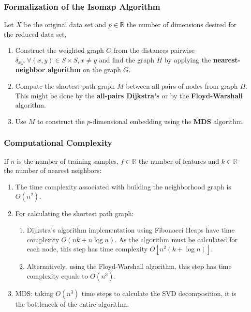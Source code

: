 \documentclass[12pt]{article}
\begin{document}
\subsubsection{Formalization of the Isomap Algorithm}

Let $X$ be the original data set and $p \in \mathbb{R}$ the number of dimensions desired for the reduced data set, \cite{ten2000}

\begin{enumerate}
	\item Construct the weighted graph $G$ from the distances pairwise $\delta_{xy}, \forall (x, y) \in S \times S, x \ne y$ and find the graph $H$ by applying the \textbf{nearest-neighbor algorithm} on the graph $G$.

	\item Compute the shortest path graph $M$ between all pairs of nodes from graph $H$. This might be done by the \textbf{all-pairs Dijkstra's} or by the \textbf{Floyd-Warshall} algorithm.

	\item Use $M$ to construct the $p$-dimensional embedding using the \textbf{MDS} algorithm.
\end{enumerate}

\subsubsection{Computational Complexity}
\label{sec:isocomplexity}

If $n$ is the number of training samples, $f \in \mathbb{R}$ the number of features and $k \in \mathbb{R}$ the number of nearest neighbors:

\begin{enumerate}
	\item The time complexity associated with building the neighborhood graph is $O(n^2)$.
	\item For calculating the shortest path graph:
	\begin{enumerate}
		\item Dijkstra's algorithm implementation using Fibonacci Heaps have time complexity $O(nk + n \log n)$. As the algorithm must be calculated for each node, this step has time complexity $O[n^2(k + \log n)]$.
		\item Alternatively, using the Floyd-Warshall algorithm, this step has time complexity equals to $O(n^3)$.
	\end{enumerate}
	\item MDS: taking $O(n^3)$ time steps to calculate the SVD decomposition, it is the bottleneck of the entire algorithm. \cite{cay2005}
\end{enumerate}
\end{document}
